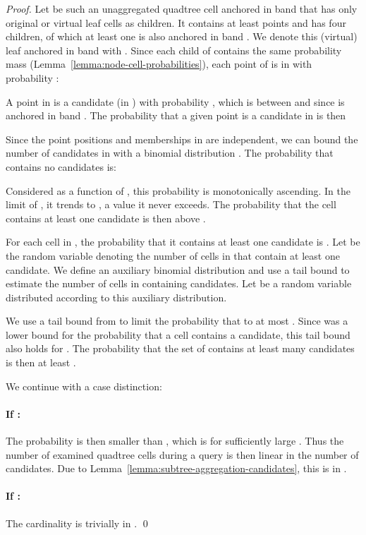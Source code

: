 \documentclass{llncs}
\begin{document}
\begin{proof}
 Let  be such an unaggregated quadtree cell anchored in band  that has only original or virtual leaf cells as children.
 It contains at least  points and has four children, of which at least one is also anchored in band .
 We denote this (virtual) leaf anchored in band  with .
 Since each child of  contains the same probability mass (Lemma~\ref{lemma:node-cell-probabilities}), each point of  is in  with probability :


A point in  is a candidate (in ) with probability , which is between  and  since  is anchored in band .
The probability that a given point  is a candidate in  is then 


Since the point positions and memberships in  are independent, we can bound the number of candidates in  with a binomial distribution .
The probability that  contains no candidates is:


Considered as a function of , this probability is monotonically ascending.
In the limit of , it trends to , a value it never exceeds.
The probability that the cell  contains at least one candidate is then above .

For each cell in \uaqcset, the probability that it contains at least one candidate is .
Let  be the random variable denoting the number of cells in \uaqcset that contain at least one candidate.
We define an auxiliary binomial distribution  and use a tail bound to estimate the number of cells in \uaqcset containing candidates.
Let  be a random variable distributed according to this auxiliary distribution.

We use a tail bound from \cite{ArratiaGordon1989} to limit the probability that  to at most .
Since  was a lower bound for the probability that a cell contains a candidate, this tail bound also holds for .
The probability that the set of \uaqcset contains at least  many candidates is then at least .

We continue with a case distinction:
\paragraph{If :}
The probability  is then smaller than , which is   for sufficiently large .
Thus the number of examined quadtree cells during a query is then linear in the number of candidates.
Due to Lemma~\ref{lemma:subtree-aggregation-candidates}, this is in .

\paragraph{If :} 
The cardinality  is trivially in .
\qed
\end{proof}
\end{document}
